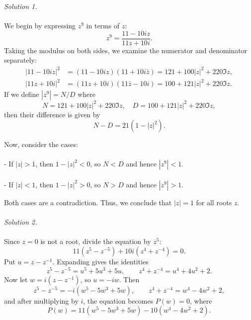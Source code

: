\begin{solution}
    \textit{Solution 1.}
    \\\\
    We begin by expressing \( z^9 \) in terms of \( z \):
    \begin{equation*}
        z^9 = \frac{11 - 10iz}{11z + 10i}.
    \end{equation*}
    Taking the modulus on both sides, we examine the numerator and denominator separately:
    \begin{align*}
        |11 - 10iz|^2 & = (11 - 10iz)(11 + 10i\bar{z}) = 121 + 100|z|^2 + 220 \Im z, \\
        |11z + 10i|^2 & = (11z + 10i)(11\bar{z} - 10i) = 100 + 121|z|^2 + 220 \Im z.
    \end{align*}
    If we define \( |z^9| = N/D \) where
    \begin{equation*}
        N = 121 + 100|z|^2 + 220 \Im z, \quad D = 100 + 121|z|^2 + 220 \Im z,
    \end{equation*}
    then their difference is given by
    \begin{equation*}
        N - D = 21\left(1 - |z|^2\right).
    \end{equation*}

    Now, consider the cases:
    \\\\
    - If \( |z| > 1 \), then \( 1 - |z|^2 < 0 \), so \( N < D \) and hence \( |z^9| < 1 \).
    \\\\
    - If \( |z| < 1 \), then \( 1 - |z|^2 > 0 \), so \( N > D \) and hence \( |z^9| > 1 \).

    Both cases are a contradiction. Thus, we conclude that \( |z| = 1 \) for all roots \( z \).
    \\\\
    \textit{Solution 2.}
    \\\\
    Since \( z = 0 \) is not a root, divide the equation by \( z^5 \):
    \begin{equation*}
        11\left(z^5 - z^{-5}\right) + 10i\left(z^4 + z^{-4}\right) = 0.
    \end{equation*}
    Put \( u = z - z^{-1} \). Expanding gives the identities
    \begin{equation*}
        z^5 - z^{-5} = u^5 + 5u^3 + 5u, \qquad z^4 + z^{-4} = u^4 + 4u^2 + 2.
    \end{equation*}
    Now let \( w = i\left(z - z^{-1}\right) \), so \( u = -iw \). Then
    \begin{equation*}
        z^5 - z^{-5} = -i\left(w^5 - 5w^3 + 5w\right), \qquad z^4 + z^{-4} = w^4 - 4w^2 + 2,
    \end{equation*}
    and after multiplying by \( i \), the equation becomes \( P\left(w\right) = 0 \), where
    \begin{equation*}
        P\left(w\right) = 11\left(w^5 - 5w^3 + 5w\right) - 10\left(w^4 - 4w^2 + 2\right).
    \end{equation*}


\end{solution}
